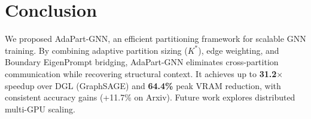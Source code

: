 \section{Conclusion} \label{sec:conclusion}
We proposed AdaPart-GNN, an efficient partitioning framework for scalable GNN training. By combining adaptive partition sizing ($K^*$), edge weighting, and Boundary EigenPrompt bridging, AdaPart-GNN eliminates cross-partition communication while recovering structural context. It achieves up to \textbf{31.2$\times$} speedup over DGL (GraphSAGE) and \textbf{64.4\%} peak VRAM reduction, with consistent accuracy gains (+11.7\% on Arxiv). Future work explores distributed multi-GPU scaling.

